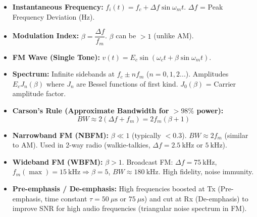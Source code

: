 \documentclass[11pt]{article}
\begin{document}
\begin{propriete}
\begin{itemize}
\item \textbf{Instantaneous Frequency:} $f_i(t) = f_c + \Delta f \sin \omega_m t$. $\Delta f$ = Peak Frequency Deviation (Hz).
\item \textbf{Modulation Index:} $\beta = \dfrac{\Delta f}{f_m}$. $\beta$ can be $>1$ (unlike AM).
\item \textbf{FM Wave (Single Tone):} $v(t) = E_c \sin(\omega_c t + \beta \sin \omega_m t)$.
\item \textbf{Spectrum:} Infinite sidebands at $f_c \pm n f_m$ ($n=0,1,2...$). Amplitudes $E_c J_n(\beta)$ where $J_n$ are Bessel functions of first kind. $J_0(\beta)$ = Carrier amplitude factor.
\item \textbf{Carson's Rule (Approximate Bandwidth for $>98\%$ power):}
\[
BW \approx 2(\Delta f + f_m) = 2f_m(\beta + 1)
\]
\item \textbf{Narrowband FM (NBFM):} $\beta \ll 1$ (typically $<0.3$). $BW \approx 2f_m$ (similar to AM). Used in 2-way radio (walkie-talkies, $\Delta f = 2.5\ \mathrm{kHz}$ or $5\ \mathrm{kHz}$).
\item \textbf{Wideband FM (WBFM):} $\beta > 1$. Broadcast FM: $\Delta f = 75\ \mathrm{kHz}$, $f_m(\max)=15\ \mathrm{kHz} \Rightarrow \beta=5$, $BW \approx 180\ \mathrm{kHz}$. High fidelity, noise immunity.
\item \textbf{Pre-emphasis / De-emphasis:} High frequencies boosted at Tx (Pre-emphasis, time constant $\tau = 50\ \mu\mathrm{s}$ or $75\ \mu\mathrm{s}$) and cut at Rx (De-emphasis) to improve SNR for high audio frequencies (triangular noise spectrum in FM).
\end{itemize}
\end{propriete}
\end{document}
